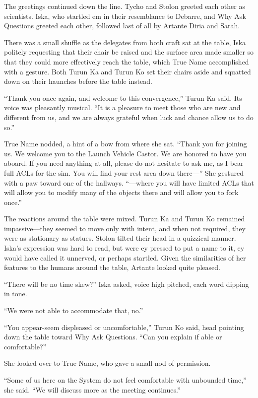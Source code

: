 The greetings continued down the line. Tycho and Stolon greeted each other as scientists. Iska, who startled em in their resemblance to Debarre, and Why Ask Questions greeted each other, followed last of all by Artante Diria and Sarah.

There was a small shuffle as the delegates from both craft sat at the table, Iska politely requesting that their chair be raised and the surface area made smaller so that they could more effectively reach the table, which True Name accomplished with a gesture. Both Turun Ka and Turun Ko set their chairs aside and squatted down on their haunches before the table instead.

``Thank you once again, and welcome to this convergence,'' Turun Ka said. Its voice was pleasantly musical. ``It is a pleasure to meet those who are new and different from us, and we are always grateful when luck and chance allow us to do so.''

True Name nodded, a hint of a bow from where she sat. ``Thank you for joining us. We welcome you to the Launch Vehicle Castor. We are honored to have you aboard. If you need anything at all, please do not hesitate to ask me, as I bear full ACLs for the sim. You will find your rest area down there—'' She gestured with a paw toward one of the hallways. ``—where you will have limited ACLs that will allow you to modify many of the objects there and will allow you to fork once.''

The reactions around the table were mixed. Turun Ka and Turun Ko remained impassive—they seemed to move only with intent, and when not required, they were as stationary as statues. Stolon tilted their head in a quizzical manner. Iska's expression was hard to read, but were ey pressed to put a name to it, ey would have called it unnerved, or perhaps startled. Given the similarities of her features to the humans around the table, Artante looked quite pleased.

``There will be no time skew?'' Iska asked, voice high pitched, each word dipping in tone.

``We were not able to accommodate that, no.''

``You appear-seem displeased or uncomfortable,'' Turun Ko said, head pointing down the table toward Why Ask Questions. ``Can you explain if able or comfortable?''

She looked over to True Name, who gave a small nod of permission.

``Some of us here on the System do not feel comfortable with unbounded time,'' she said. ``We will discuss more as the meeting continues.''

